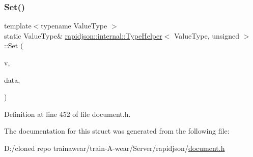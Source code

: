 \subsubsection{\texorpdfstring{Set()}{Set()}\hspace{0.1cm}{\footnotesize\ttfamily [2/2]}}
{\footnotesize\ttfamily template$<$typename Value\+Type $>$ \\
static Value\+Type\& \mbox{\hyperlink{structrapidjson_1_1internal_1_1_type_helper}{rapidjson\+::internal\+::\+Type\+Helper}}$<$ Value\+Type, unsigned $>$\+::Set (\begin{DoxyParamCaption}\item[{Value\+Type \&}]{v,  }\item[{unsigned}]{data,  }\item[{typename Value\+Type\+::\+Allocator\+Type \&}]{ }\end{DoxyParamCaption})\hspace{0.3cm}{\ttfamily [static]}}



Definition at line 452 of file document.\+h.


\begin{DoxyCode}{0}

\end{DoxyCode}


The documentation for this struct was generated from the following file\+:\begin{DoxyCompactItemize}
\item 
D\+:/cloned repo trainawear/train-\/\+A-\/wear/\+Server/rapidjson/\mbox{\hyperlink{document_8h}{document.\+h}}\end{DoxyCompactItemize}
